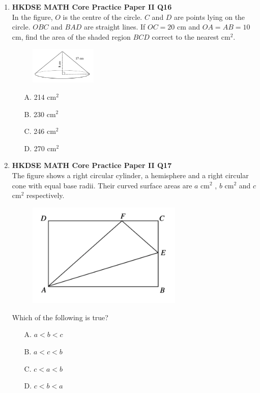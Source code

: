 \documentclass[12pt]{article}
\begin{document}
\begin{enumerate}
	\item \textbf{HKDSE MATH Core Practice Paper II Q16}\\
	In the figure, $O$ is the centre of the circle. $C$ and $D$ are points lying on the circle. $OBC$ and $BAD$ are straight lines. If $OC = 20$ cm and $OA = AB = 10$ cm, find the area of the shaded region $BCD$ correct to the nearest cm$^2$.
	\begin{figure}[h]
		\centering
		\includegraphics[width = 0.3\textwidth]{PPFigure2.16.png}	
	\end{figure}
	\begin{enumerate}
		\item[A.] 214 cm$^2$
		\item[B.] 230 cm$^2$
		\item[C.] 246 cm$^2$
		\item[D.] 270 cm$^2$
	\end{enumerate}

	\item \textbf{HKDSE MATH Core Practice Paper II Q17}\\
	The figure shows a right circular cylinder, a hemisphere and a right circular cone with equal base radii. Their curved surface areas are $a$ cm$^2$ , $b$ cm$^2$ and $c$ cm$^2$ respectively.\\
	\begin{figure}[H]
		\centering
		\includegraphics[width = 0.7\textwidth]{PPFigure2.17.png}	
	\end{figure}
	Which of the following is true?
	\begin{enumerate}
		\item[A.] $a < b < c$
		\item[B.] $a < c < b$
		\item[C.] $c < a < b$
		\item[D.] $c < b < a$
	\end{enumerate}


\end{enumerate}
\end{document}
